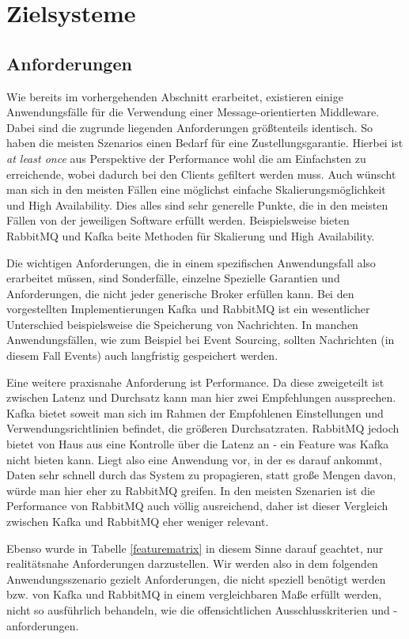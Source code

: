 \section{Zielsysteme}
\subsection{Anforderungen}
Wie bereits im vorhergehenden Abschnitt erarbeitet, existieren einige
Anwendungsfälle für die Verwendung einer Message-orientierten Middleware.
Dabei sind die zugrunde liegenden Anforderungen größtenteils identisch.
So haben die meisten Szenarios einen Bedarf für eine Zustellungsgarantie.
Hierbei ist \textit{at least once} aus Perspektive der Performance wohl die
am Einfachsten zu erreichende, wobei dadurch bei den Clients gefiltert werden
muss. Auch wünscht man sich in den meisten Fällen eine möglichst einfache
Skalierungsmöglichkeit und High Availability. Dies alles sind sehr generelle
Punkte, die in den meisten Fällen von der jeweiligen Software erfüllt werden.
Beispielsweise bieten RabbitMQ und Kafka beite Methoden für Skalierung und High
Availability.

Die wichtigen Anforderungen, die in einem spezifischen Anwendungsfall also
erarbeitet müssen, sind Sonderfälle, einzelne Spezielle Garantien und
Anforderungen, die nicht jeder generische Broker erfüllen kann.
Bei den vorgestellten Implementierungen Kafka und RabbitMQ ist ein
wesentlicher Unterschied beispielsweise die Speicherung von Nachrichten.
In manchen Anwendungsfällen, wie zum Beispiel bei Event Sourcing, sollten
Nachrichten (in diesem Fall Events) auch langfristig gespeichert werden.

Eine weitere praxisnahe Anforderung ist Performance. Da diese zweigeteilt
ist zwischen Latenz und Durchsatz kann man hier zwei Empfehlungen aussprechen.
Kafka bietet soweit man sich im Rahmen der Empfohlenen Einstellungen und
Verwendungsrichtlinien befindet, die größeren Durchsatzraten. RabbitMQ
jedoch bietet von Haus aus eine Kontrolle über die Latenz an - ein Feature
was Kafka nicht bieten kann. Liegt also eine Anwendung vor, in der es darauf
ankommt, Daten sehr schnell durch das System zu propagieren, statt große Mengen
davon, würde man hier eher zu RabbitMQ greifen. In den meisten Szenarien
ist die Performance von RabbitMQ auch völlig ausreichend, daher ist dieser
Vergleich zwischen Kafka und RabbitMQ eher weniger relevant.

Ebenso wurde in Tabelle \ref{featurematrix} in diesem Sinne darauf geachtet,
nur realitätsnahe Anforderungen darzustellen.
Wir werden also in dem folgenden Anwendungsszenario gezielt Anforderungen,
die nicht speziell benötigt werden bzw. von Kafka und RabbitMQ in einem
vergleichbaren Maße erfüllt werden, nicht so ausführlich behandeln, wie
die offensichtlichen Ausschlusskriterien und -anforderungen.

